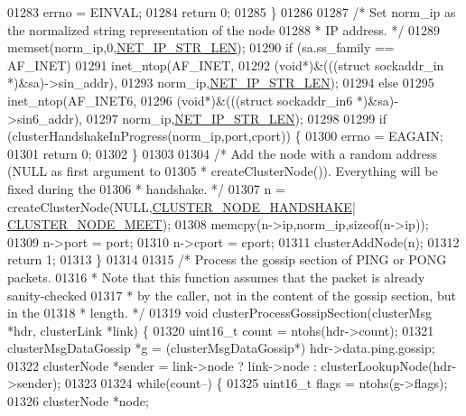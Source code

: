 \begin{DoxyCode}
{{{{{{{{{{{{{{{{{01283         errno = EINVAL;
01284         \textcolor{keywordflow}{return} 0;
01285     \}
01286 
01287     \textcolor{comment}{/* Set norm\_ip as the normalized string representation of the node}
01288 \textcolor{comment}{     * IP address. */}
01289     memset(norm\_ip,0,\hyperlink{server_8h_ad97c5405ed22a94e9fcc10fba577d6c0}{NET\_IP\_STR\_LEN});
01290     \textcolor{keywordflow}{if} (sa.ss\_family == AF\_INET)
01291         inet\_ntop(AF\_INET,
01292             (\textcolor{keywordtype}{void}*)&(((\textcolor{keyword}{struct} sockaddr\_in *)&sa)->sin\_addr),
01293             norm\_ip,\hyperlink{server_8h_ad97c5405ed22a94e9fcc10fba577d6c0}{NET\_IP\_STR\_LEN});
01294     \textcolor{keywordflow}{else}
01295         inet\_ntop(AF\_INET6,
01296             (\textcolor{keywordtype}{void}*)&(((\textcolor{keyword}{struct} sockaddr\_in6 *)&sa)->sin6\_addr),
01297             norm\_ip,\hyperlink{server_8h_ad97c5405ed22a94e9fcc10fba577d6c0}{NET\_IP\_STR\_LEN});
01298 
01299     \textcolor{keywordflow}{if} (clusterHandshakeInProgress(norm\_ip,port,cport)) \{
01300         errno = EAGAIN;
01301         \textcolor{keywordflow}{return} 0;
01302     \}
01303 
01304     \textcolor{comment}{/* Add the node with a random address (NULL as first argument to}
01305 \textcolor{comment}{     * createClusterNode()). Everything will be fixed during the}
01306 \textcolor{comment}{     * handshake. */}
01307     n = createClusterNode(NULL,\hyperlink{cluster_8h_a60571342a067f1e5772a04b36feff6a6}{CLUSTER\_NODE\_HANDSHAKE}|
      \hyperlink{cluster_8h_ad992a5c70af8bc805aae5405106ff9f7}{CLUSTER\_NODE\_MEET});
01308     memcpy(n->ip,norm\_ip,\textcolor{keyword}{sizeof}(n->ip));
01309     n->port = port;
01310     n->cport = cport;
01311     clusterAddNode(n);
01312     \textcolor{keywordflow}{return} 1;
01313 \}
01314 
01315 \textcolor{comment}{/* Process the gossip section of PING or PONG packets.}
01316 \textcolor{comment}{ * Note that this function assumes that the packet is already sanity-checked}
01317 \textcolor{comment}{ * by the caller, not in the content of the gossip section, but in the}
01318 \textcolor{comment}{ * length. */}
01319 \textcolor{keywordtype}{void} clusterProcessGossipSection(clusterMsg *hdr, clusterLink *link) \{
01320     uint16\_t count = ntohs(hdr->count);
01321     clusterMsgDataGossip *g = (clusterMsgDataGossip*) hdr->data.ping.gossip;
01322     clusterNode *sender = link->node ? link->node : clusterLookupNode(hdr->sender);
01323 
01324     \textcolor{keywordflow}{while}(count--) \{
01325         uint16\_t flags = ntohs(g->flags);
01326         clusterNode *node;
}}}}}}}}}}}}}}}}}
\end{DoxyCode}

